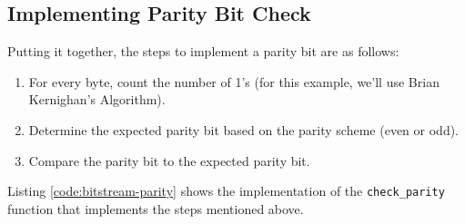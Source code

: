 \documentclass[main.tex]{subfiles}
\begin{document}
\subsection{Implementing Parity Bit Check}
Putting it together, the steps to implement a parity bit are as follows:
\begin{enumerate}
    \item For every byte, count the number of 1's (for this example, we'll use Brian Kernighan's Algorithm).
    \item Determine the expected parity bit based on the parity scheme (even or odd).
    \item Compare the parity bit to the expected parity bit.
\end{enumerate}

\noindent Listing \ref{code:bitstream-parity} shows the implementation of the \texttt{check\_parity} function that implements the steps mentioned above.


\end{document}
